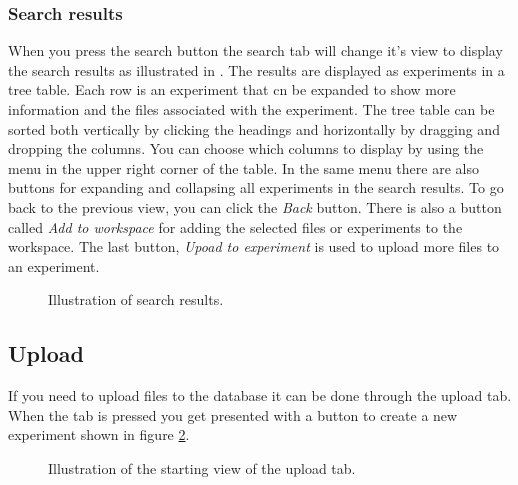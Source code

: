 \subsubsection{Search results}
When you press the search button the search tab will change it's view to display the search results as illustrated in . The results are displayed as experiments in a tree table. Each row is an experiment that cn be expanded to show more information and the files associated with the experiment. The tree table can be sorted both vertically by clicking the headings and horizontally by dragging and dropping the columns. You can choose which columns to display by using the menu in the upper right corner of the table. In the same menu there are also buttons for expanding and collapsing all experiments in the search results. To go back to the previous view, you can click the \emph{Back} button. There is also a button called \emph{Add to workspace} for adding the selected files or experiments to the workspace. The last button, \emph{Upoad to experiment} is used to upload more files to an experiment.

\begin{figure}[htb]
	\caption{Illustration of search results.}
	\label{fig:des_search-results}
\end{figure}
\FloatBarrier

\subsection{Upload}
If you need to upload files to the database it can be done through the upload tab. When the tab is pressed you get presented with a button to create a new experiment shown in figure \ref{fig:des_upload-tab}.
\newpage
\begin{figure}[h!]
	\caption{Illustration of the starting view of the upload tab.}
	\label{fig:des_upload-tab}
\end{figure}
